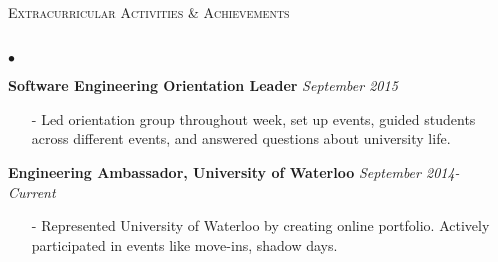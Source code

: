 \documentclass[10pt]{article}
\newcommand{\lineunder}{\vspace*{-8pt} \\ \hspace*{-18pt} \hrulefill \\}
\newcommand{\header}[1]{{\hspace*{-15pt}\vspace*{6pt} \textsc{#1}} \vspace*{-6pt} \lineunder }
\newenvironment{achievements}{\begin{list}{$\bullet$}{\topsep 0pt \itemsep -1.5pt \leftmargin 5pt}}{\vspace*{4pt}\end{list}}
\begin{document}
\vspace{10pt}

\header{\fontsize{11}{12}\selectfont Extracurricular Activities \& Achievements}
\begin{achievements}
\item \textbf{Software Engineering Orientation Leader} \hfill \textit {September 2015}
\begin{itemize}
\item[-] Led orientation group throughout week, set up events, guided students across different events, and answered questions about university life.
\end{itemize}
\vspace{2pt}
\item \textbf{Engineering Ambassador, University of Waterloo} \hfill \textit {September 2014- Current}
\begin{itemize}
\item[-] Represented University of Waterloo by creating online portfolio. Actively participated in events like move-ins, shadow days.
\end{itemize}
\end{achievements}
\end{document}
